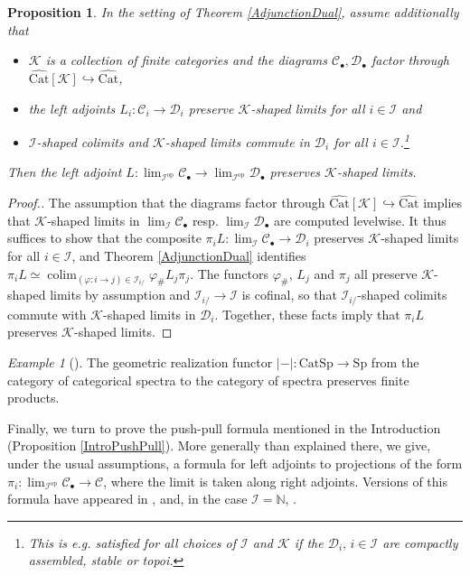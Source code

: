 \documentclass[a4paper,reqno,10pt]{amsart}
\newtheorem{proposition}[theorem]{Proposition}
\theoremstyle{definition}
\theoremstyle{remark}
\newtheorem{example}[theorem]{Example}
\newcommand{\sqb}[1]{\left\lbrack #1\right\rbrack}
\newcommand{\abs}[1]{\left\lvert #1\right\rvert}
\newcommand{\N}{\mathbb{N}}
\newcommand{\C}{\mathcal{C}}
\newcommand{\D}{\mathcal{D}}
\newcommand{\I}{\mathcal{I}}
\newcommand{\K}{\mathcal{K}}
\DeclareMathOperator*{\colim}{colim}
\newcommand{\Cat}{\mathrm{Cat}}
\newcommand{\Sp}{\mathrm{Sp}}
\newcommand{\op}{\mathrm{op}}
\begin{document}
\begin{proposition}\label{FiniteLimits}
In the setting of Theorem \ref{AdjunctionDual}, assume additionally that
\begin{itemize}
\item $\K$ is a collection of finite categories and the diagrams $\C_{\bullet},\D_{\bullet}$ factor through $\widehat{\Cat}\sqb{\K}\hookrightarrow\widehat{\Cat}$,
\item the left adjoints $L_i\colon\C_i\rightarrow\D_i$ preserve $\K$-shaped limits for all $i\in\I$ and
\item $\I$-shaped colimits and $\K$-shaped limits commute in $\D_i$ for all $i\in\I$.\footnote{This is e.g. satisfied for all choices of $\I$ and $\K$ if the $\D_i,\,i\in\I$ are compactly assembled, stable or topoi.}
\end{itemize}
Then the left adjoint $L\colon\lim_{\I^{\op}}\C_{\bullet}\rightarrow\lim_{\I^{\op}}\D_{\bullet}$ preserves $\K$-shaped limits.
\end{proposition}
\begin{proof}[Proof.]
The assumption that the diagrams factor through $\widehat{\Cat}\sqb{\K}\hookrightarrow\widehat{\Cat}$ implies that $\K$-shaped limits in $\lim_{\I}\C_{\bullet}$ resp. $\lim_{\I}\D_{\bullet}$ are computed levelwise. It thus suffices to show that the composite $\pi_iL\colon\lim_{\I}\C_{\bullet}\rightarrow\D_i$ preserves $\K$-shaped limits for all $i\in\I$, and Theorem \ref{AdjunctionDual} identifies $\pi_iL\simeq\colim_{(\varphi\colon i\rightarrow j)\in\I_{i/}}\varphi_{\#}L_j\pi_j$. The functors $\varphi_{\#}$, $L_j$ and $\pi_j$ all preserve $\K$-shaped limits by assumption and $\I_{i/}\rightarrow\I$ is cofinal, so that $\I_{i/}$-shaped colimits commute with $\K$-shaped limits in $\D_i$. Together, these facts imply that $\pi_iL$ preserves $\K$-shaped limits.
\end{proof}
\begin{example}[]
The geometric realization functor $\abs{-}\colon\Cat\Sp\rightarrow\Sp$ from the category of categorical spectra to the category of spectra preserves finite products.
\end{example}

Finally, we turn to prove the push-pull formula mentioned in the Introduction (Proposition \ref{IntroPushPull}). More generally than explained there, we give, under the usual assumptions, a formula for left adjoints to projections of the form $\pi_i\colon\lim_{\I^{\op}}\C_{\bullet}\rightarrow\C$, where the limit is taken along right adjoints. Versions of this formula have appeared in \cite[Lemma 1.3.6]{Gaitsgory}, \cite[Proposition 1.66,2)]{Efimov} and, in the case $\I=\N$, \cite[Corollary B.0.6]{Geiss}.
\end{document}
